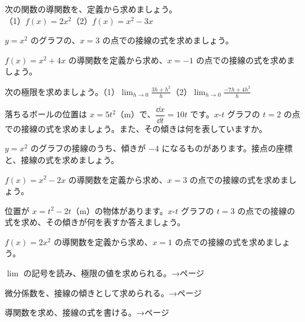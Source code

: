 \bkproblem 次の関数の導関数を、定義から求めましょう。\\（1）$f(x)=2x^2$\quad（2）$f(x)=x^2-3x$

\bkproblem $y=x^2$ のグラフの、$x=3$ の点での接線の式を求めましょう。

\bkproblem $f(x)=x^2+4x$ の導関数を定義から求め、$x=-1$ の点での接線の式を求めましょう。

\bkproblem 次の極限を求めましょう。\quad（1）$\displaystyle\lim_{h\to0}\frac{3h+h^2}{h}$\quad（2）$\displaystyle\lim_{h\to0}\frac{-7h+4h^2}{h}$


\bkproblem 落ちるボールの位置は $x=5t^2$（m）で、$\dfrac{\dd x}{\dd t}=10t$ です。$x$-$t$ グラフの $t=2$ の点での接線の式を求めましょう。また、その傾きは何を表していますか。

\bkproblem $y=x^2$ のグラフの接線のうち、傾きが $-4$ になるものがあります。接点の座標と、接線の式を求めましょう。

\bkproblem $f(x)=x^2-2x$ の導関数を定義から求め、$x=3$ の点での接線の式を求めましょう。

\bkproblem 位置が $x=t^2-2t$（m）の物体があります。$x$-$t$ グラフの $t=3$ の点での接線の式を求め、その傾きが何を表すか答えましょう。

\bkproblem $f(x)=2x^2$ の導関数を定義から求め、$x=1$ の点での接線の式を求めましょう。

\begin{furikaeri}
\begin{checklist}
\item $\lim$ の記号を読み、極限の値を求められる。\hfill{\footnotesize\sffamily\color{bkTheme}→\pageref{bk:5-3:lim}ページ}
\item 微分係数を、接線の傾きとして求められる。\hfill{\footnotesize\sffamily\color{bkTheme}→\pageref{bk:5-3:bibunkeisu}ページ}
\item 導関数を求め、接線の式を書ける。\hfill{\footnotesize\sffamily\color{bkTheme}→\pageref{bk:5-3:shiki}ページ}
\end{checklist}
\end{furikaeri}

